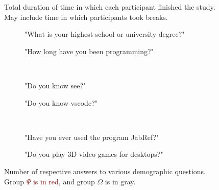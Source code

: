 \documentclass[../thesis]{subfiles}
\begin{document}
\begin{figure}
	\begin{center}
	\end{center}
	\caption{Total duration of time in which each participant finished the study.\\
		May include time in which participants took breaks.}\label{fig:dat_totaltime}
\end{figure}

\begin{figure}
	\begin{subfigure}[T]{0.55\textwidth}
		\caption{"What is your highest school or university degree?"\label{fig:degreebar}}
	\end{subfigure}\hfill
	\begin{subfigure}[T]{0.45\textwidth}
		\caption{"How long have you been programming?"\label{fig:programmingbar}}
	\end{subfigure}\\
	\begin{subfigure}[T]{0.55\textwidth}
		\caption{"Do you know \gls{see}?"\label{fig:knowseebar}}
	\end{subfigure}\hfill
	\begin{subfigure}[T]{0.45\textwidth}
		\caption{"Do you know \gls{vscode}?"\label{fig:knowvsbar}}
	\end{subfigure}\\
	\begin{subfigure}[T]{0.55\textwidth}
		\caption{"Have you ever used the program JabRef?"\label{fig:knowjabrefbar}}
	\end{subfigure}\hfill
	\begin{subfigure}[T]{0.45\textwidth}
		\caption{"Do you play 3D video games for desktops?"\label{fig:knowgamebar}}
	\end{subfigure}
	\caption{Number of respective answers to various demographic questions.\\
		Group \textcolor{Maroon}{$\Psi$ is in red}, and group \textcolor{Gray!50!black}{$\Omega$ is in gray}.}\label{fig:demobars}
\end{figure}
\end{document}
